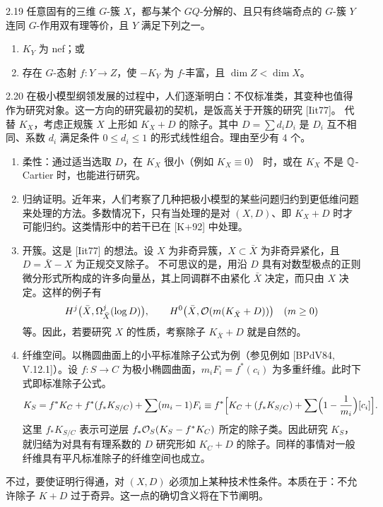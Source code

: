 \begin{theorem*}{2.19}
任意固有的三维 $G$-簇 $X$，都与某个 $GQ$-分解的、且只有终端奇点的 $G$-簇 $Y$ 连同 $G$-作用双有理等价，且 $Y$ 满足下列之一。
\begin{enumerate}[label=（\arabic*）,leftmargin=2.6em,itemsep=1pt]
\item $K_Y$ 为 nef；或
\item 存在 $G$-态射 $f\colon Y\to Z$，使 $-K_Y$ 为 $f$-丰富，且 $\dim Z<\dim X$。
\end{enumerate}
\end{theorem*}

\begin{example}[对数簇]{2.20}
在极小模型纲领发展的过程中，人们逐渐明白：不仅标准类，其变种也值得作为研究对象。这一方向的研究最初的契机，是饭高关于开簇的研究 [Iit77]。
代替 $K_X$，考虑正规簇 $X$ 上形如 $K_X+D$ 的除子。其中 $D=\sum d_iD_i$ 是 $D_i$ 互不相同、系数 $d_i$ 满足条件 $0\le d_i\le1$ 的形式线性组合。理由至少有 4 个。
\begin{enumerate}[label=（\arabic*）,leftmargin=2.6em,itemsep=1pt]
\item 柔性：通过适当选取 $D$，在 $K_X$ 很小（例如 $K_X\equiv0$）
时，或在 $K_X$ 不是 $\mathbb{Q}$-Cartier 时，也能进行研究。
\item 归纳证明。近年来，人们考察了几种把极小模型的某些问题归约到更低维问题来处理的方法。多数情况下，只有当处理的是对 $(X,D)$、即 $K_X+D$ 时才可能归约。这类情形中的若干已在 [K+92] 中处理。
\item 开簇。这是 [Iit77] 的想法。设 $X$ 为非奇异簇，$X\subset\bar X$ 为非奇异紧化，且 $D=\bar X-X$ 为正规交叉除子。
不可思议的是，用沿 $D$ 具有对数型极点的正则微分形式所构成的许多向量丛，其上同调群不由紧化 $\bar X$ 决定，而只由 $X$ 决定。这样的例子有
\[
H^j\bigl(\bar X,\Omega^j_{\bar X}(\log D)\bigr),\qquad H^0\bigl(\bar X,\mathcal{O}(m(K_{\bar X}+D))\bigr)\quad(m\ge0)
\]
等。因此，若要研究 $X$ 的性质，考察除子 $K_{\bar X}+D$ 就是自然的。
\item 纤维空间。以椭圆曲面上的小平标准除子公式为例（参见例如 [BPdV84, V.12.1]）。设 $f\colon S\to C$ 为极小椭圆曲面，$m_iF_i=f^*(c_i)$ 为多重纤维。此时下式即标准除子公式。
\[
K_S=f^*K_C+f^*(f_*K_{S/C})+\sum(m_i-1)F_i
\equiv f^*\Bigl[K_C+(f_*K_{S/C})+\sum\Bigl(1-\frac{1}{m_i}\Bigr)[c_i]\Bigr].
\]
这里 $f_*K_{S/C}$ 表示可逆层 $f_*\mathcal{O}_S(K_S-f^*K_C)$ 所定的除子类。因此研究 $K_S$，就归结为对具有有理系数的 $D$ 研究形如 $K_C+D$ 的除子。同样的事情对一般纤维具有平凡标准除子的纤维空间也成立。
\end{enumerate}
不过，要使证明行得通，对 $(X,D)$ 必须加上某种技术性条件。本质在于：不允许除子 $K+D$ 过于奇异。这一点的确切含义将在下节阐明。
\end{example}

